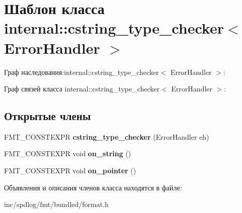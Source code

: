 \hypertarget{classinternal_1_1cstring__type__checker}{}\section{Шаблон класса internal\+:\+:cstring\+\_\+type\+\_\+checker$<$ Error\+Handler $>$}
\label{classinternal_1_1cstring__type__checker}


Граф наследования\+:internal\+:\+:cstring\+\_\+type\+\_\+checker$<$ Error\+Handler $>$\+:


Граф связей класса internal\+:\+:cstring\+\_\+type\+\_\+checker$<$ Error\+Handler $>$\+:
\subsection*{Открытые члены}
\begin{DoxyCompactItemize}
\item 
\mbox{\label{classinternal_1_1cstring__type__checker_a8915e7dae89952f58ae63d14e5d67b17}} 
F\+M\+T\+\_\+\+C\+O\+N\+S\+T\+E\+X\+PR {\bfseries cstring\+\_\+type\+\_\+checker} (Error\+Handler eh)
\item 
\mbox{\label{classinternal_1_1cstring__type__checker_abf4cc18d281faa1e7974f1dbba95dd98}} 
F\+M\+T\+\_\+\+C\+O\+N\+S\+T\+E\+X\+PR void {\bfseries on\+\_\+string} ()
\item 
\mbox{\label{classinternal_1_1cstring__type__checker_a08fec53620704e141326e0341328fb88}} 
F\+M\+T\+\_\+\+C\+O\+N\+S\+T\+E\+X\+PR void {\bfseries on\+\_\+pointer} ()
\end{DoxyCompactItemize}


Объявления и описания членов класса находятся в файле\+:\begin{DoxyCompactItemize}
\item 
inc/spdlog/fmt/bundled/format.\+h\end{DoxyCompactItemize}
